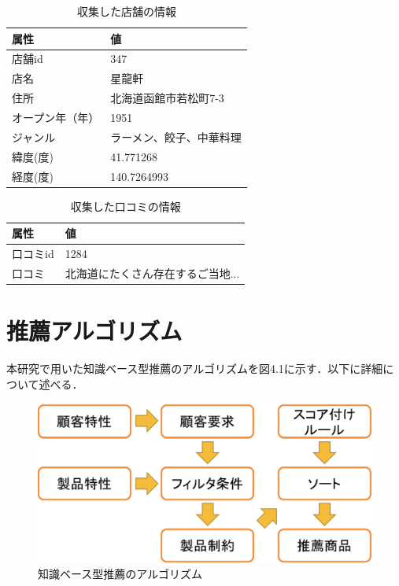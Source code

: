 \documentclass{funthesis}
\begin{document}
\begin{table}[htb]
  \begin{center}
  \scriptsize
    \caption{収集した店舗の情報}
    \normalsize
   \begin{tabular}{p{6cm}|p{6cm}}
    \hline
属性 & 値 \\ \hline\hline
      店舗id & 347 \\ \hline
      店名 & 星龍軒 \\ \hline
      住所 &  北海道函館市若松町7-3\\ \hline
      オープン年（年）& 1951 \\ \hline
      ジャンル & ラーメン、餃子、中華料理 \\ \hline
      緯度(度) & 41.771268 \\ \hline
      経度(度) & 140.7264993 \\ \hline
  \end{tabular}
  \end{center}
\end{table}

\begin{table}[htb]
  \begin{center}
  \scriptsize
    \caption{収集した口コミの情報}
    \normalsize
   \begin{tabular}{p{6cm}|p{6cm}}
    \hline
属性 & 値 \\ \hline\hline
      口コミid &1284\\ \hline
      口コミ & 北海道にたくさん存在するご当地... \\ \hline
  \end{tabular}
  \end{center}
\end{table}


\section{推薦アルゴリズム}
本研究で用いた知識ベース型推薦のアルゴリズムを図4.1に示す．以下に詳細について述べる．

\begin{figure}[tbp]
  \begin{center}
    \includegraphics[clip,width=13cm]{model.eps}
    \caption{知識ベース型推薦のアルゴリズム}
  \end{center}
\end{figure}
\end{document}

